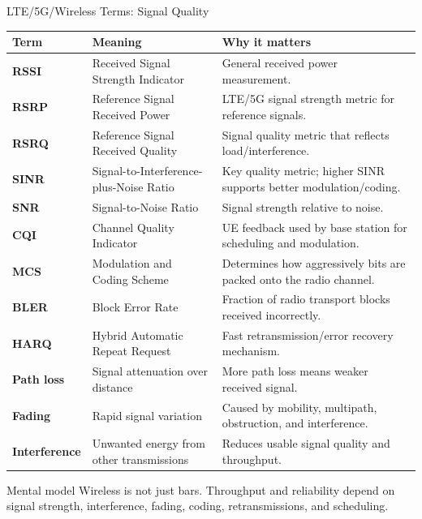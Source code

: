 \documentclass[aspectratio=169]{beamer}
\begin{document}
\begin{frame}{LTE/5G/Wireless Terms: Signal Quality}
\tiny
\begin{tabular}{p{2.0cm} p{3.4cm} p{6.7cm}}
\toprule
\textbf{Term} & \textbf{Meaning} & \textbf{Why it matters} \\
\midrule
\textbf{RSSI} & Received Signal Strength Indicator & General received power measurement. \\
\textbf{RSRP} & Reference Signal Received Power & LTE/5G signal strength metric for reference signals. \\
\textbf{RSRQ} & Reference Signal Received Quality & Signal quality metric that reflects load/interference. \\
\textbf{SINR} & Signal-to-Interference-plus-Noise Ratio & Key quality metric; higher SINR supports better modulation/coding. \\
\textbf{SNR} & Signal-to-Noise Ratio & Signal strength relative to noise. \\
\textbf{CQI} & Channel Quality Indicator & UE feedback used by base station for scheduling and modulation. \\
\textbf{MCS} & Modulation and Coding Scheme & Determines how aggressively bits are packed onto the radio channel. \\
\textbf{BLER} & Block Error Rate & Fraction of radio transport blocks received incorrectly. \\
\textbf{HARQ} & Hybrid Automatic Repeat Request & Fast retransmission/error recovery mechanism. \\
\textbf{Path loss} & Signal attenuation over distance & More path loss means weaker received signal. \\
\textbf{Fading} & Rapid signal variation & Caused by mobility, multipath, obstruction, and interference. \\
\textbf{Interference} & Unwanted energy from other transmissions & Reduces usable signal quality and throughput. \\
\bottomrule
\end{tabular}

\vspace{0.15cm}
\begin{block}{Mental model}
Wireless is not just bars. Throughput and reliability depend on signal strength, interference, fading, coding, retransmissions, and scheduling.
\end{block}
\end{frame}
\end{document}
